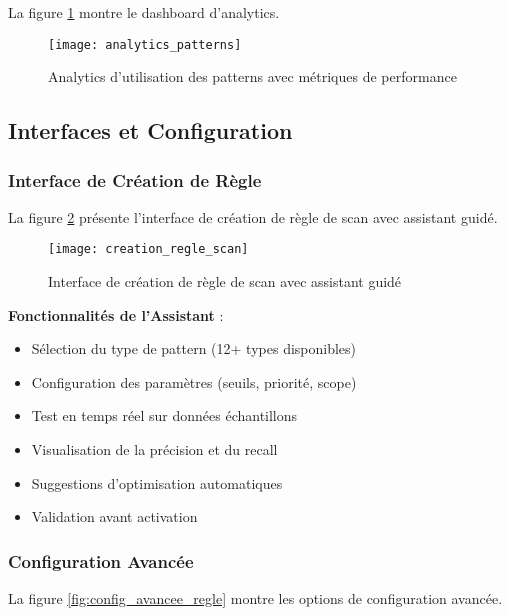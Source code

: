 La figure \ref{fig:analytics_patterns} montre le dashboard d'analytics.

\begin{figure}[htpb]
\centering
\texttt{[image: analytics\_patterns]}
\caption{Analytics d'utilisation des patterns avec métriques de performance}
\label{fig:analytics_patterns}
\end{figure}

\subsection{Interfaces et Configuration}

\subsubsection{Interface de Création de Règle}

La figure \ref{fig:creation_regle_scan} présente l'interface de création de règle de scan avec assistant guidé.

\begin{figure}[htpb]
\centering
\texttt{[image: creation\_regle\_scan]}
\caption{Interface de création de règle de scan avec assistant guidé}
\label{fig:creation_regle_scan}
\end{figure}

\textbf{Fonctionnalités de l'Assistant} :
\begin{itemize}
    \item Sélection du type de pattern (12+ types disponibles)
    \item Configuration des paramètres (seuils, priorité, scope)
    \item Test en temps réel sur données échantillons
    \item Visualisation de la précision et du recall
    \item Suggestions d'optimisation automatiques
    \item Validation avant activation
\end{itemize}

\subsubsection{Configuration Avancée}

La figure \ref{fig:config_avancee_regle} montre les options de configuration avancée.

